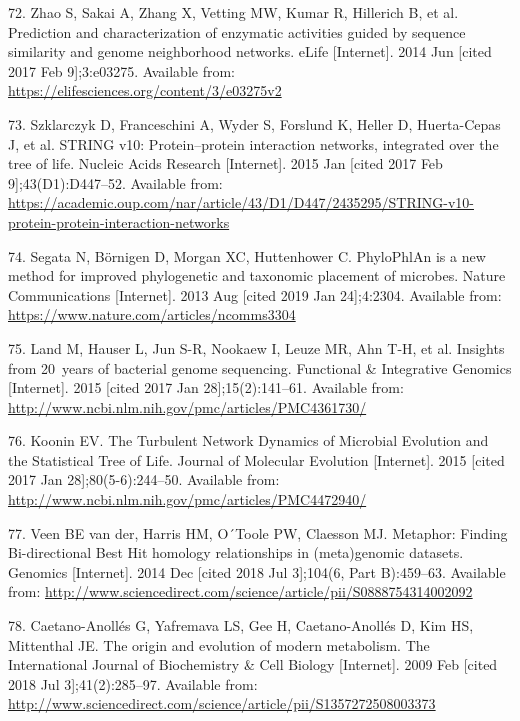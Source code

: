 \documentclass[12pt,twoside]{reedthesis}
\begin{document}
  \hypertarget{ref-zhao__function_prediction_neighbourhood_2014}{}
  72. Zhao S, Sakai A, Zhang X, Vetting MW, Kumar R, Hillerich B, et al.
  Prediction and characterization of enzymatic activities guided by
  sequence similarity and genome neighborhood networks. eLife
  {[}Internet{]}. 2014 Jun {[}cited 2017 Feb 9{]};3:e03275. Available
  from: \url{https://elifesciences.org/content/3/e03275v2}
  
  \hypertarget{ref-szklarczyk_string_2015}{}
  73. Szklarczyk D, Franceschini A, Wyder S, Forslund K, Heller D,
  Huerta-Cepas J, et al. STRING v10: Protein--protein interaction
  networks, integrated over the tree of life. Nucleic Acids Research
  {[}Internet{]}. 2015 Jan {[}cited 2017 Feb 9{]};43(D1):D447--52.
  Available from:
  \url{https://academic.oup.com/nar/article/43/D1/D447/2435295/STRING-v10-protein-protein-interaction-networks}
  
  \hypertarget{ref-segata_phylophlan_2013}{}
  74. Segata N, Börnigen D, Morgan XC, Huttenhower C. PhyloPhlAn is a new
  method for improved phylogenetic and taxonomic placement of microbes.
  Nature Communications {[}Internet{]}. 2013 Aug {[}cited 2019 Jan
  24{]};4:2304. Available from:
  \url{https://www.nature.com/articles/ncomms3304}
  
  \hypertarget{ref-land_insights_2015}{}
  75. Land M, Hauser L, Jun S-R, Nookaew I, Leuze MR, Ahn T-H, et al.
  Insights from 20~years of bacterial genome sequencing. Functional \&
  Integrative Genomics {[}Internet{]}. 2015 {[}cited 2017 Jan
  28{]};15(2):141--61. Available from:
  \url{http://www.ncbi.nlm.nih.gov/pmc/articles/PMC4361730/}
  
  \hypertarget{ref-koonin_turbulent_2015}{}
  76. Koonin EV. The Turbulent Network Dynamics of Microbial Evolution and
  the Statistical Tree of Life. Journal of Molecular Evolution
  {[}Internet{]}. 2015 {[}cited 2017 Jan 28{]};80(5-6):244--50. Available
  from: \url{http://www.ncbi.nlm.nih.gov/pmc/articles/PMC4472940/}
  
  \hypertarget{ref-van_der_veen_metaphor_2014}{}
  77. Veen BE van der, Harris HM, O´Toole PW, Claesson MJ. Metaphor:
  Finding Bi-directional Best Hit homology relationships in (meta)genomic
  datasets. Genomics {[}Internet{]}. 2014 Dec {[}cited 2018 Jul
  3{]};104(6, Part B):459--63. Available from:
  \url{http://www.sciencedirect.com/science/article/pii/S0888754314002092}
  
  \hypertarget{ref-caetano-anolles_origin_metabolism_2009}{}
  78. Caetano-Anollés G, Yafremava LS, Gee H, Caetano-Anollés D, Kim HS,
  Mittenthal JE. The origin and evolution of modern metabolism. The
  International Journal of Biochemistry \& Cell Biology {[}Internet{]}.
  2009 Feb {[}cited 2018 Jul 3{]};41(2):285--97. Available from:
  \url{http://www.sciencedirect.com/science/article/pii/S1357272508003373}
  
\end{document}
